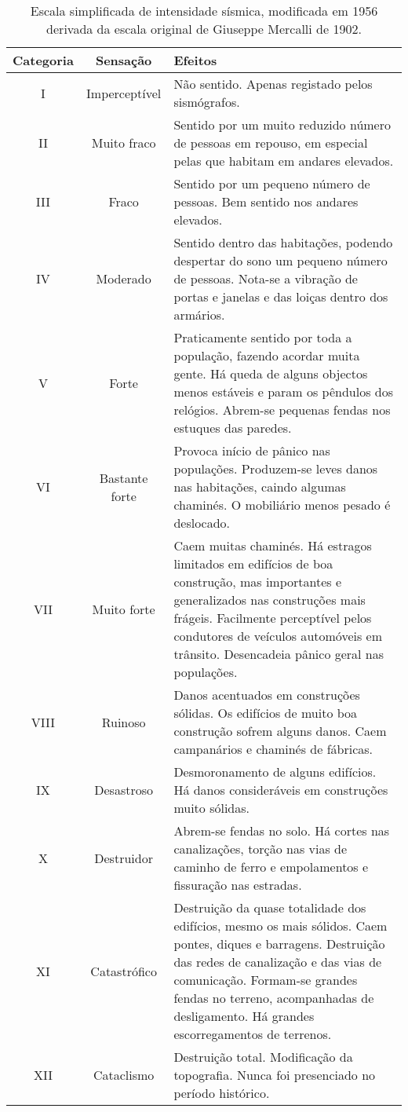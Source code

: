 \begin{table}[H]
\begin{center}
\begin{scriptsize}
\noindent\begin{tabular}{c|c|p{12cm}}
\hline
Categoria  	& Sensação & Efeitos \\
\hline
I 			&	Imperceptível 	&	Não sentido. Apenas registado pelos sismógrafos.
\\II 		&	Muito fraco 	&	Sentido por um muito reduzido número de pessoas em
								repouso, em especial pelas que habitam em andares
								elevados.
\\III 		&	Fraco 			&	Sentido por um pequeno número de pessoas. Bem sentido nos andares elevados.
\\IV 		&	Moderado 		&	Sentido dentro das habitações, podendo despertar do sono um pequeno número de pessoas.
								Nota-se a vibração de
								portas e janelas e das loiças dentro dos armários.
\\V 		&	Forte 			&	Praticamente sentido por toda a população, fazendo acordar muita gente.
								Há queda de alguns objectos menos estáveis e param os pêndulos dos relógios.
								Abrem-se pequenas fendas nos estuques das paredes.
\\VI 		&	Bastante forte 	&	Provoca início de pânico nas populações. Produzem-se leves danos nas habitações,
								caindo algumas chaminés. O mobiliário menos pesado é deslocado.
\\VII 		&	Muito forte 	&	Caem muitas chaminés. Há estragos limitados em edifícios de boa construção,
								mas importantes e generalizados nas construções mais frágeis.
								Facilmente perceptível pelos condutores de veículos automóveis em trânsito.
								Desencadeia pânico geral nas populações.
\\VIII 		&	Ruinoso  		&	Danos acentuados em construções sólidas. Os edifícios de muito boa construção
								sofrem alguns danos. Caem campanários e chaminés de fábricas.
\\IX 		&	Desastroso 		&	Desmoronamento de alguns edifícios. Há danos consideráveis em construções muito sólidas.
\\X 		&	Destruidor 		&	Abrem-se fendas no solo. Há cortes nas canalizações, torção nas vias de caminho
								de ferro e empolamentos e fissuração nas estradas.
\\XI 		&	Catastrófico 	&	Destruição da quase totalidade dos edifícios, mesmo os mais sólidos.
								Caem pontes, diques e barragens. Destruição das redes de canalização e das vias de comunicação.
								Formam-se grandes fendas no terreno, acompanhadas de desligamento. Há grandes escorregamentos de terrenos.
\\XII 		&	Cataclismo 		&	Destruição total. Modificação da topografia. Nunca foi presenciado no período histórico. \\
\hline
\end{tabular}
\caption{Escala simplificada de intensidade sísmica,
modificada em 1956 derivada da escala original de Giuseppe Mercalli de 1902.}
\label{tab:mercalli}
\end{scriptsize}
\end{center}
\end{table}

